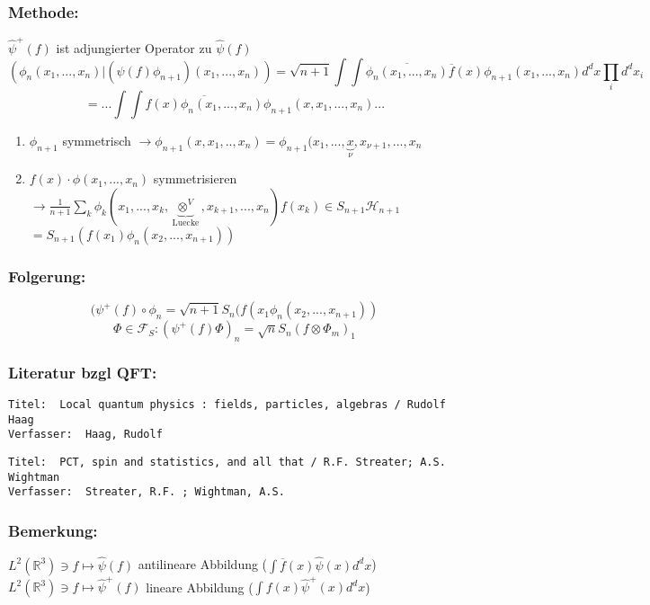 \documentclass[twoside,a4paper]{scrartcl}
\newcommand{\R}{\mathbb{R}}
\renewcommand{\1}{\mathds{1}}
\newcommand{\ra}{\rightarrow}
\renewcommand{\H}{\mathcal{H}}
\newcommand{\F}{\mathcal{F}}
\renewcommand{\R}{\mathbb{R}}
\begin{document}
\subsubsection*{Methode:}
$\hat \psi^+(f)$ ist adjungierter Operator zu $\hat \psi(f)$
$$(\phi_n(x_1,...,x_n)|(\psi(f)\phi_{n+1})(x_1,...,x_n))=\sqrt{n+1}\int \int \overline{\phi_n(x_1,...,x_n)}\overline{f}(x) \phi_{n+1}(x_1,...,x_n)d^dx \prod_i d^dx_i$$
$$=...\int \int \overline{f(x)\phi_n(x_1,...,x_n)} \phi_{n+1}(x,x_1,...,x_n)...$$
\begin{enumerate}
\item $\phi_{n+1}$ symmetrisch $\ra \phi_{n+1}(x,x_1,..,x_n)=\phi_{n+1}(x_1,...,\underbrace{x}_{\nu},x_{\nu+1},...,x_n$
\item $f(x) \cdot \phi(x_1,...,x_n)$ symmetrisieren $\ra \frac{1}{n+1} \sum_k \phi_k(x_1,...,x_k,\underbrace{\otimes^V}_{\mathrm{Luecke}},x_{k+1},...,x_n)f(x_k) \in S_{n+1}\H_{n+1}$\\
$=S_{n+1}(f(x_1)\phi_n(x_2,...,x_{n+1}))$
\end{enumerate}
\subsubsection*{Folgerung:}
$$(\psi^+(f)\circ \phi_n=\sqrt{n+1} S_n (f(x_1 \phi_n(x_2,...,x_{n+1}))$$
$$\Phi \in \F_S: (\psi^+(f)\Phi)_n=\sqrt{n} S_n(f \otimes \Phi_m)_1 $$
\subsubsection*{Literatur bzgl QFT:}
\begin{tiny}
\begin{verbatim}
Titel: 	Local quantum physics : fields, particles, algebras / Rudolf Haag
Verfasser: 	Haag, Rudolf
\end{verbatim}
\end{tiny}

\begin{tiny}
\begin{verbatim}
Titel: 	PCT, spin and statistics, and all that / R.F. Streater; A.S. Wightman
Verfasser: 	Streater, R.F. ; Wightman, A.S.
\end{verbatim}
\end{tiny}

\subsubsection*{Bemerkung:}
$L^2(\R^3) \ni f \mapsto \hat \psi(f)$ antilineare Abbildung ($\int \overline{f}(x)\hat \psi(x)d^dx$)\\
$L^2(\R^3) \ni f \mapsto \hat \psi^+(f)$ lineare Abbildung ($\int {f}(x)\hat \psi^+(x)d^dx$)\\
\end{document}
